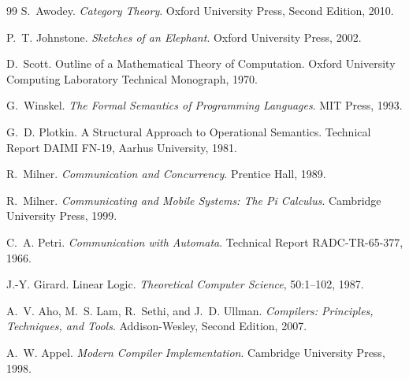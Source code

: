 \documentclass[12pt,oneside]{article}
\theoremstyle{definition}
\theoremstyle{remark}
\begin{document}
\begin{thebibliography}{99}
S.~Awodey.
\newblock \emph{Category Theory}.
\newblock Oxford University Press, Second Edition, 2010.

P.~T. Johnstone.
\newblock \emph{Sketches of an Elephant}.
\newblock Oxford University Press, 2002.


D.~Scott.
\newblock Outline of a Mathematical Theory of Computation.
\newblock Oxford University Computing Laboratory Technical Monograph, 1970.

G.~Winskel.
\newblock \emph{The Formal Semantics of Programming Languages}.
\newblock MIT Press, 1993.

G.~D. Plotkin.
\newblock A Structural Approach to Operational Semantics.
\newblock Technical Report DAIMI FN-19, Aarhus University, 1981.


R.~Milner.
\newblock \emph{Communication and Concurrency}.
\newblock Prentice Hall, 1989.

R.~Milner.
\newblock \emph{Communicating and Mobile Systems: The Pi Calculus}.
\newblock Cambridge University Press, 1999.

C.~A. Petri.
\newblock \emph{Communication with Automata}.
\newblock Technical Report RADC-TR-65-377, 1966.


J.-Y. Girard.
\newblock Linear Logic.
\newblock \emph{Theoretical Computer Science}, 50:1--102, 1987.


A.~V. Aho, M.~S. Lam, R.~Sethi, and J.~D. Ullman.
\newblock \emph{Compilers: Principles, Techniques, and Tools}.
\newblock Addison-Wesley, Second Edition, 2007.

A.~W. Appel.
\newblock \emph{Modern Compiler Implementation}.
\newblock Cambridge University Press, 1998.


\end{thebibliography}
\end{document}
